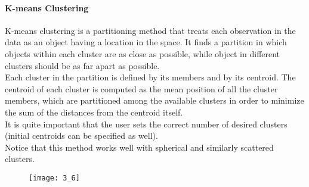 \paragraph{K-means Clustering}
K-means clustering is a partitioning method that treats each observation in the data as
an object having a location in the space. It finds a partition in which objects within
each cluster are as close as possible, while object in different clusters should be as
far apart as possible.\\
Each cluster in the partition is defined by its members and by its centroid.
The centroid of each cluster is computed as the mean position of all the cluster members,
which are partitioned among the available clusters in order to minimize the sum of
the distances from the centroid itself.\\
It is quite important that the user sets the correct number of  desired clusters
(initial centroids can be specified as well).\\
Notice that this method works well with spherical and similarly scattered clusters.
\begin{figure}[H]
    \texttt{[image: 3\_6]}
    \centering
\end{figure}
